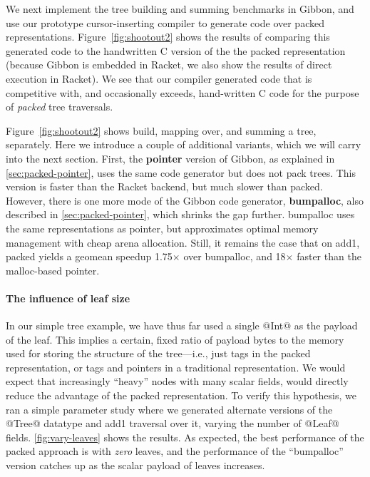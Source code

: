 \documentclass[a4paper,english]{lipics-v2016}
\newcommand{\treelang}{Gibbon\xspace} %
\begin{document}
We next implement the tree building and summing benchmarks in \treelang{}, and
use our prototype cursor-inserting compiler to generate code over packed
representations.
% 
Figure~\ref{fig:shootout2} shows the results of comparing this
generated code to the handwritten C version of the the packed representation
(because \treelang{} is embedded in Racket, we also show the results of direct
execution in Racket).
%
{We see that our compiler generated code that is competitive with, and
  occasionally exceeds, hand-written C code for the purpose of {\em packed} tree
  traversals.}

{Figure~\ref{fig:shootout2} shows build, mapping over, and summing a tree, separately.
  Here we introduce a couple of additional variants, which we will carry into
  the next section.  First, the {\bf pointer} version of Gibbon, as explained in
  \cref{sec:packed-pointer}, uses the same code generator but does not pack
  trees.  This version is faster than the Racket backend, but much slower than
  packed.  However, there is one more mode of the Gibbon code generator, {\bf
    bumpalloc}, also described in \cref{sec:packed-pointer}, which shrinks the
  gap further.  bumpalloc uses the same representations as pointer, but
  approximates optimal memory management with cheap arena allocation.  Still, it
  remains the case that on add1, packed yields a geomean speedup 1.75$\times$
  over bumpalloc, and 18$\times$ faster than the malloc-based pointer.}



\paragraph*{The influence of leaf size}

In our simple tree example, we have thus far used a single @Int@ as the payload
of the leaf.  This implies a certain, fixed ratio of payload bytes to the memory
used for storing the structure of the tree---i.e., just tags in the packed
representation, or tags and pointers in a traditional representation.
%
We would expect that increasingly ``heavy'' nodes with many scalar fields, would
directly reduce the advantage of the packed representation.
To verify this hypothesis, we ran a simple parameter study where we generated
alternate versions of the @Tree@ datatype and add1 traversal over it, varying
the number of @Leaf@ fields.
\cref{fig:vary-leaves} shows the results.
%
As expected, the best performance of the packed approach is with {\em zero}
leaves, and the performance of the ``bumpalloc'' version catches up as the
scalar payload of leaves increases.
\end{document}
